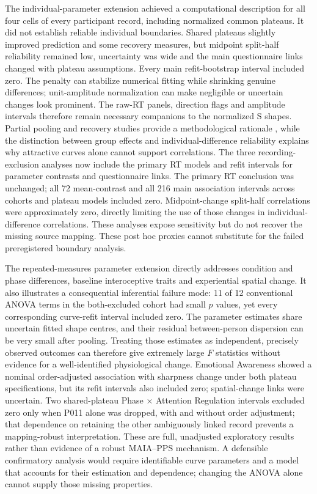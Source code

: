 The individual-parameter extension achieved a computational description for all four cells of every participant record, including normalized common plateaus. It did not establish reliable individual boundaries. Shared plateaus slightly improved prediction and some recovery measures, but midpoint split-half reliability remained low, uncertainty was wide and the main questionnaire links changed with plateau assumptions. Every main refit-bootstrap interval included zero. The penalty can stabilize numerical fitting while shrinking genuine differences; unit-amplitude normalization can make negligible or uncertain changes look prominent. The raw-RT panels, direction flags and amplitude intervals therefore remain necessary companions to the normalized S shapes. Partial pooling and recovery studies provide a methodological rationale \citep{Ahn2011}, while the distinction between group effects and individual-difference reliability \citep{Hedge2018} explains why attractive curves alone cannot support correlations. The three recording-exclusion analyses now include the primary RT models and refit intervals for parameter contrasts and questionnaire links. The primary RT conclusion was unchanged; all 72 mean-contrast and all 216 main association intervals across cohorts and plateau models included zero. Midpoint-change split-half correlations were approximately zero, directly limiting the use of those changes in individual-difference correlations. These analyses expose sensitivity but do not recover the missing source mapping. These post hoc proxies cannot substitute for the failed preregistered boundary analysis.

The repeated-measures parameter extension directly addresses condition and phase differences, baseline interoceptive traits and experiential spatial change. It also illustrates a consequential inferential failure mode: 11 of 12 conventional ANOVA terms in the both-excluded cohort had small $p$ values, yet every corresponding curve-refit interval included zero. The parameter estimates share uncertain fitted shape centres, and their residual between-person dispersion can be very small after pooling. Treating those estimates as independent, precisely observed outcomes can therefore give extremely large $F$ statistics without evidence for a well-identified physiological change. Emotional Awareness showed a nominal order-adjusted association with sharpness change under both plateau specifications, but its refit intervals also included zero; spatial-change links were uncertain. Two shared-plateau Phase $\times$ Attention Regulation intervals excluded zero only when P011 alone was dropped, with and without order adjustment; that dependence on retaining the other ambiguously linked record prevents a mapping-robust interpretation. These are full, unadjusted exploratory results rather than evidence of a robust MAIA--PPS mechanism. A defensible confirmatory analysis would require identifiable curve parameters and a model that accounts for their estimation and dependence; changing the ANOVA alone cannot supply those missing properties.

